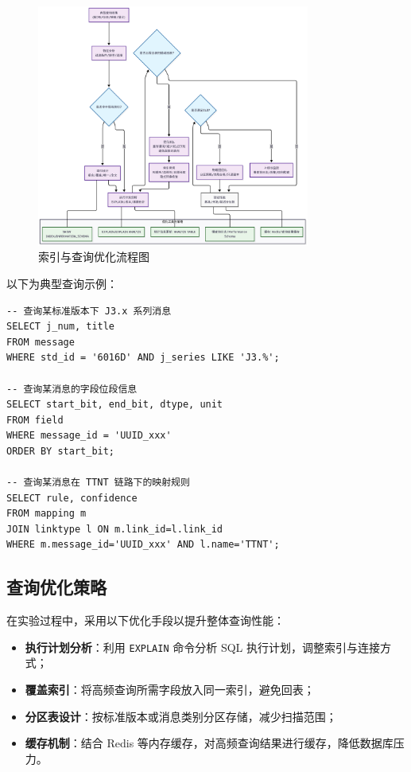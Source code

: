 \begin{figure}[H]
    \centering
    \includegraphics[width=0.8\textwidth,height=0.33\textheight,keepaspectratio]{chapters/fig-0/index-opt.png}
    \caption{索引与查询优化流程图}
    \label{fig_index_opt}
\end{figure}
以下为典型查询示例：

\begin{verbatim}
-- 查询某标准版本下 J3.x 系列消息
SELECT j_num, title
FROM message
WHERE std_id = '6016D' AND j_series LIKE 'J3.%';

-- 查询某消息的字段位段信息
SELECT start_bit, end_bit, dtype, unit
FROM field
WHERE message_id = 'UUID_xxx'
ORDER BY start_bit;

-- 查询某消息在 TTNT 链路下的映射规则
SELECT rule, confidence
FROM mapping m
JOIN linktype l ON m.link_id=l.link_id
WHERE m.message_id='UUID_xxx' AND l.name='TTNT';
\end{verbatim}

\subsection{查询优化策略}
在实验过程中，采用以下优化手段以提升整体查询性能：
\begin{itemize}
  \item \textbf{执行计划分析}：利用 \texttt{EXPLAIN} 命令分析 SQL 执行计划，调整索引与连接方式；
  \item \textbf{覆盖索引}：将高频查询所需字段放入同一索引，避免回表；
  \item \textbf{分区表设计}：按标准版本或消息类别分区存储，减少扫描范围；
  \item \textbf{缓存机制}：结合 Redis 等内存缓存，对高频查询结果进行缓存，降低数据库压力。
\end{itemize}

